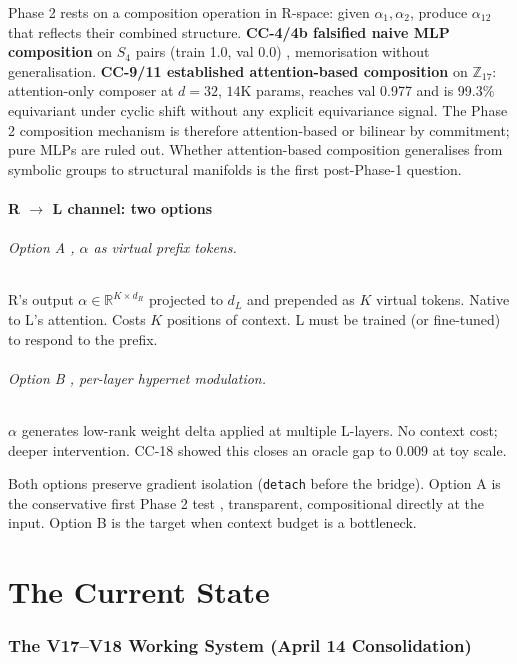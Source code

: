 \documentclass[10pt, twocolumn, a4paper]{article}
\newcommand{\R}{\mathbb{R}}
\begin{document}
Phase 2 rests on a composition operation in R-space: given $\alpha_1, \alpha_2$, produce $\alpha_{12}$ that reflects their combined structure. \textbf{CC-4/4b falsified naive MLP composition} on $S_4$ pairs (train 1.0, val 0.0) ,  memorisation without generalisation. \textbf{CC-9/11 established attention-based composition} on $\mathbb{Z}_{17}$: attention-only composer at $d{=}32$, $14$K params, reaches val 0.977 and is 99.3\% equivariant under cyclic shift without any explicit equivariance signal. The Phase 2 composition mechanism is therefore attention-based or bilinear by commitment; pure MLPs are ruled out. Whether attention-based composition generalises from symbolic groups to structural manifolds is the first post-Phase-1 question.

\subsection*{R $\to$ L channel: two options}

\paragraph{Option A ,  $\alpha$ as virtual prefix tokens.} R's output $\alpha \in \R^{K \times d_R}$ projected to $d_L$ and prepended as $K$ virtual tokens. Native to L's attention. Costs $K$ positions of context. L must be trained (or fine-tuned) to respond to the prefix.

\paragraph{Option B ,  per-layer hypernet modulation.} $\alpha$ generates low-rank weight delta applied at multiple L-layers. No context cost; deeper intervention. CC-18 showed this closes an oracle gap to 0.009 at toy scale.

Both options preserve gradient isolation (\texttt{detach} before the bridge). Option A is the conservative first Phase 2 test ,  transparent, compositional directly at the input. Option B is the target when context budget is a bottleneck.


\part{The Current State}

\section{The V17--V18 Working System (April 14 Consolidation)}
\end{document}
